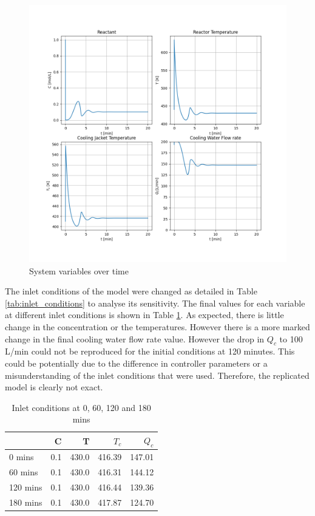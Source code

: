 \documentclass{article}
\begin{document}
\begin{figure}[H]
	\centering
	\includegraphics[width=1\textwidth]{img/baseline_model_results}
	\caption{System variables over time}
	\label{fig:baseline_model_results.png}
\end{figure}

The inlet conditions of the model were changed as detailed in Table \ref{tab:inlet_conditions} to analyse its sensitivity. The final values for each variable at different inlet conditions is shown in Table \ref{tab:baseline_model_sens}. As expected, there is little change in the concentration or the temperatures. However there is a more marked change in the final cooling water flow rate value. However the drop in $Q_c$ to 100 L/min could not be reproduced for the initial conditions at 120 minutes. This could be potentially due to the difference in controller parameters or a misunderstanding of the inlet conditions that were used. Therefore, the replicated model is clearly not exact.

\begin{table}[H]
	\caption{Inlet conditions at 0, 60, 120 and 180 mins}
	\label{tab:baseline_model_sens}
	\centering
\begin{tabular}{lrrrr}
	\toprule
	{} &    C &      T &   $T_c$ &   $Q_c$ \\
	\midrule
	0 mins   &  0.1 &  430.0 &  416.39 &  147.01 \\
	60 mins  &  0.1 &  430.0 &  416.31 &  144.12 \\
	120 mins &  0.1 &  430.0 &  416.44 &  139.36 \\
	180 mins &  0.1 &  430.0 &  417.87 &  124.70 \\
	\bottomrule
\end{tabular}
\end{table}
\end{document}
